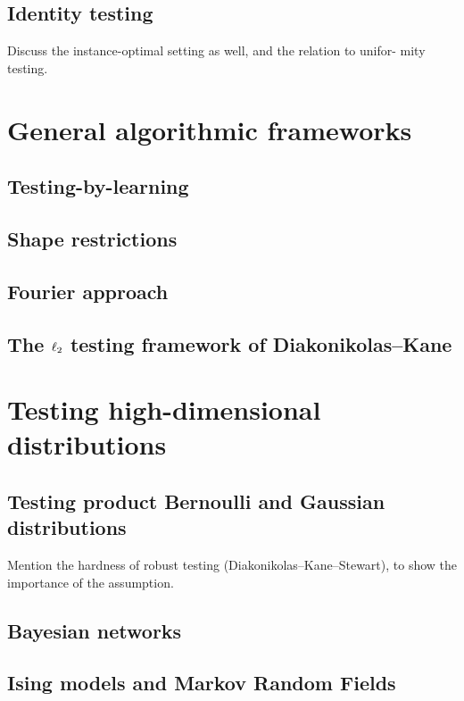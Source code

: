 \documentclass[biber]{nowfnt} %
\begin{document}
\section{Identity testing}
Discuss the instance-optimal setting as well, and the relation to unifor-
mity testing.


\chapter{General algorithmic frameworks}
\section{Testing-by-learning}
\section{Shape restrictions}
\section{Fourier approach}
\section{The $\lp[2]$ testing framework of Diakonikolas--Kane}

\chapter{Testing high-dimensional distributions}

\section{Testing product Bernoulli and Gaussian distributions}
Mention the hardness of robust testing (Diakonikolas--Kane--Stewart),
to show the importance of the assumption.

\section{Bayesian networks}
\section{Ising models and Markov Random Fields}
\end{document}
